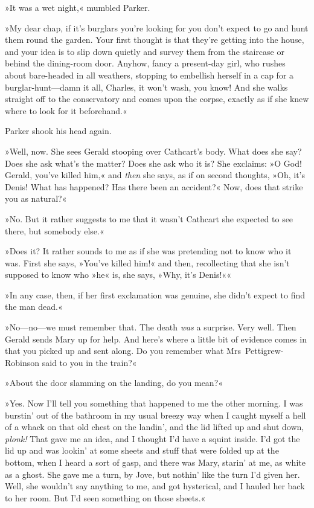 »It was a wet night,« mumbled Parker.

»My dear chap, if it's burglars you're looking for you don't expect to go and hunt them round the garden. Your first thought is that they're getting into the house, and your idea is to slip down quietly and survey them from the staircase or behind the dining-room door. Anyhow, fancy a present-day girl, who rushes about bare-headed in all weathers, stopping to embellish herself in a cap for a burglar-hunt—damn it all, Charles, it won't wash, you know! And she walks straight off to the conservatory and comes upon the corpse, exactly as if she knew where to look for it beforehand.«

Parker shook his head again.

»Well, now. She sees Gerald stooping over Cathcart's body. What does she say? Does she ask what's the matter? Does she ask who it is? She exclaims: »O God! Gerald, you've killed him,« and \textit{then} she says, as if on second thoughts, »Oh, it's Denis! What has happened? Has there been an accident?« Now, does that strike you as natural?«

»No. But it rather suggests to me that it wasn't Cathcart she expected to see there, but somebody else.«

»Does it? It rather sounds to me as if she was pretending not to know who it was. First she says, »You've killed him!« and then, recollecting that she isn't supposed to know who »he« is, she says, »Why, it's Denis!««

»In any case, then, if her first exclamation was genuine, she didn't expect to find the man dead.«

»No—no—we must remember that. The death \textit{was} a surprise. Very well.  Then Gerald sends Mary up for help. And here's where a little bit of evidence comes in that you picked up and sent along. Do you remember what Mrs~Pettigrew-Robinson said to you in the train?«

»About the door slamming on the landing, do you mean?«

»Yes. Now I'll tell you something that happened to me the other morning. I was burstin' out of the bathroom in my usual breezy way when I caught myself a hell of a whack on that old chest on the landin', and the lid lifted up and shut down, \textit{plonk!} That gave me an idea, and I thought I'd have a squint inside. I'd got the lid up and was lookin' at some sheets and stuff that were folded up at the bottom, when I heard a sort of gasp, and there was Mary, starin' at me, as white as a ghost.  She gave me a turn, by Jove, but nothin' like the turn I'd given her.  Well, she wouldn't say anything to me, and got hysterical, and I hauled her back to her room. But I'd seen something on those sheets.«

